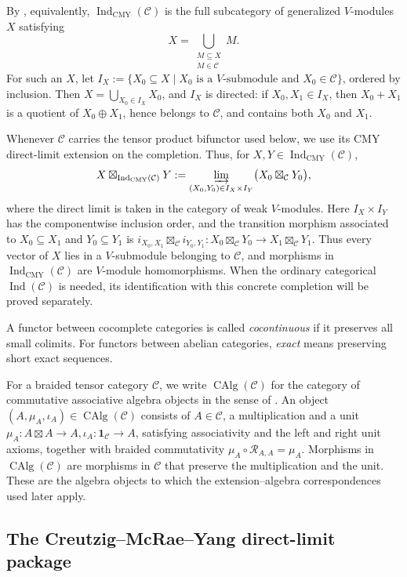 \documentclass[10pt,a4paper]{amsart}
\numberwithin{equation}{section} \newtheorem{thm}{Theorem}[section] \newtheorem{lem}[thm]{Lemma} \newtheorem{ex}[thm]{Example} \newtheorem{prop}[thm]{Proposition} \newtheorem{cor}[thm]{Corollary} \newtheorem{defi}[thm]{Definition} \newtheorem{rmk}[thm]{Remark} \newtheorem{notation}[thm]{Notation}
\newcommand{\CAlg}{\operatorname{CAlg}}
\newcommand{\IndCMY}{\operatorname{Ind}_{\mathrm{CMY}}}
\begin{document}
By \cite[Proposition~4.6]{CMY}, equivalently, \(\IndCMY(\mathcal C)\) is the full subcategory of generalized $V$-modules $X$ satisfying
\[
X=\bigcup_{\substack{M\subseteq X\\ M\in\mathcal C}}M.
\]
For such an $X$, let \(I_X:=\{X_0\subseteq X\mid X_0\text{ is a $V$-submodule and }X_0\in\mathcal C\}\), ordered by inclusion. Then $X=\bigcup_{X_0\in I_X}X_0$, and $I_X$ is directed: if $X_0,X_1\in I_X$, then $X_0+X_1$ is a quotient of $X_0\oplus X_1$, hence belongs to $\mathcal C$, and contains both $X_0$ and $X_1$.

Whenever $\mathcal C$ carries the tensor product bifunctor used below, we use its CMY direct-limit extension on the completion. Thus, for $X,Y\in\IndCMY(\mathcal C)$,
\[
X\boxtimes_{\IndCMY(\mathcal C)}Y:=\varinjlim_{(X_0,Y_0)\in I_X\times I_Y}\bigl(X_0\boxtimes_{\mathcal C}Y_0\bigr),
\]
where the direct limit is taken in the category of weak $V$-modules. Here $I_X\times I_Y$ has the componentwise inclusion order, and the transition morphism associated to $X_0\subseteq X_1$ and $Y_0\subseteq Y_1$ is \(i_{X_0,X_1}\boxtimes_{\mathcal C}i_{Y_0,Y_1}: X_0\boxtimes_{\mathcal C}Y_0\longrightarrow X_1\boxtimes_{\mathcal C}Y_1\). Thus every vector of $X$ lies in a $V$-submodule belonging to $\mathcal C$, and morphisms in $\IndCMY(\mathcal C)$ are $V$-module homomorphisms. When the ordinary categorical $\operatorname{Ind}(\mathcal C)$ is needed, its identification with this concrete completion will be proved separately.

A functor between cocomplete categories is called \emph{cocontinuous} if it preserves all small colimits. For functors between abelian categories, \emph{exact} means preserving short exact sequences.

For a braided tensor category $\mathcal C$, we write $\CAlg(\mathcal C)$ for the category of commutative associative algebra objects in the sense of \cite[Definition~7.4]{CMY}. An object \((A,\mu_A,\iota_A)\in\CAlg(\mathcal C)\) consists of $A\in\mathcal C$, a multiplication and a unit \(\mu_A:A\boxtimes A\longrightarrow A,\iota_A:\mathbf 1_{\mathcal C}\longrightarrow A\), satisfying associativity and the left and right unit axioms, together with braided commutativity \(\mu_A\circ\mathcal R_{A,A}=\mu_A.\) Morphisms in $\CAlg(\mathcal C)$ are morphisms in $\mathcal C$ that preserve the multiplication and the unit. These are the algebra objects to which the extension--algebra correspondences used later apply.

\subsection{The Creutzig--McRae--Yang direct-limit package}
\label{subsec:CMY-package}
\end{document}
